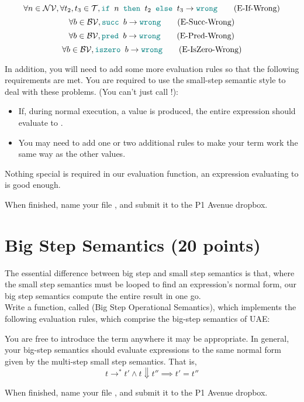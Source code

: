 \documentclass{exam}
\let\OldTexttt\texttt
\renewcommand{\texttt}[1]{\OldTexttt{\color{teal}{#1}}}
\begin{document}
\begin{equation}
\forall n \in \mathcal{NV}, \forall t_2, t_3 \in \mathcal{T}, \texttt{if } n \texttt{ then } t_2 \texttt{ else } t_3 \rightarrow \texttt{wrong} \tag{E-If-Wrong}
\end{equation}
\begin{equation}
\forall b \in \mathcal{BV}, \texttt{succ } b \rightarrow \texttt{wrong} \tag{E-Succ-Wrong}
\end{equation}
\begin{equation}
\forall b \in \mathcal{BV}, \texttt{pred } b \rightarrow \texttt{wrong} \tag{E-Pred-Wrong}
\end{equation}
\begin{equation}
\forall b \in \mathcal{BV}, \texttt{iszero } b \rightarrow \texttt{wrong} \tag{E-IsZero-Wrong}
\end{equation}

In addition, you will need to add some more evaluation rules so that the following requirements are met.  You are required to use the small-step semantic style to deal with these problems. (You can't just call \texttt{error}!):
\begin{itemize}
\item If, during normal execution, a \texttt{wrong} value is produced, the entire expression should evaluate to \texttt{wrong}.  
\item You may need to add one or two additional rules to make your \texttt{wrong} term work the same way as the other values. 
\end{itemize}

Nothing special is required in our evaluation function, an expression evaluating to \texttt{wrong} is good enough.  

When finished, name your file \texttt{UAE2.hs}, and submit it to the P1 Avenue dropbox.

\section{Big Step Semantics (20 points)}
The essential difference between big step and small step semantics is that, where the small step semantics must be looped to find an expression's normal form, our big step semantics compute the entire result in one go.  \\

Write a function, called \texttt{bsos} (Big Step Operational Semantics), which implements the following evaluation rules, which comprise the big-step semantics of UAE:
\begin{center}
\texttt{[image: figures/bigstep.png]}
\end{center}

You are free to introduce the \texttt{Wrong} term anywhere it may be appropriate.  In general, your big-step semantics should evaluate expressions to the same normal form given by the multi-step small step semantics.  That is,
\begin{equation}
t \rightarrow^* t' \land t \Downarrow t'' \implies t' = t''
\end{equation}

When finished, name your file \texttt{UAE3.hs}, and submit it to the P1 Avenue dropbox.
\end{document}
